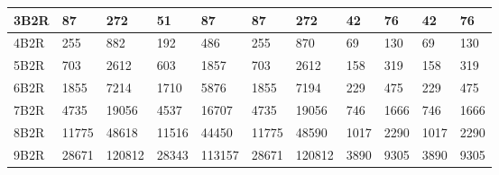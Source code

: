 \begin{table}[H]
\begin{tabular}{l|l|l|l|l|l|l|l|l|l|l|}
\multicolumn{1}{|l|}{3B2R}  & 87         & 272        & 51                                  & 87                                   & 87                                        & 272                                      & 42                                  & 76                                & 42                                  & 76                                \\ \hline
\multicolumn{1}{|l|}{4B2R}  & 255        & 882        & 192                                 & 486                                  & 255                                       & 870                                      & 69                                  & 130                               & 69                                  & 130                               \\ \hline
\multicolumn{1}{|l|}{5B2R}  & 703        & 2612       & 603                                 & 1857                                 & 703                                       & 2612                                     & 158                                 & 319                               & 158                                 & 319                               \\ \hline
\multicolumn{1}{|l|}{6B2R}  & 1855       & 7214       & 1710                                & 5876                                 & 1855                                      & 7194                                     & 229                                 & 475                               & 229                                 & 475                               \\ \hline
\multicolumn{1}{|l|}{7B2R}  & 4735       & 19056      & 4537                                & 16707                                & 4735                                      & 19056                                    & 746                                 & 1666                              & 746                                 & 1666                              \\ \hline
\multicolumn{1}{|l|}{8B2R}  & 11775      & 48618      & 11516                               & 44450                                & 11775                                     & 48590                                    & 1017                                & 2290                              & 1017                                & 2290                              \\ \hline
\multicolumn{1}{|l|}{9B2R}  & 28671      & 120812     & 28343                               & 113157                               & 28671                                     & 120812                                   & 3890                                & 9305                              & 3890                                & 9305                              \\ \hline

\end{tabular}
\end{table}
